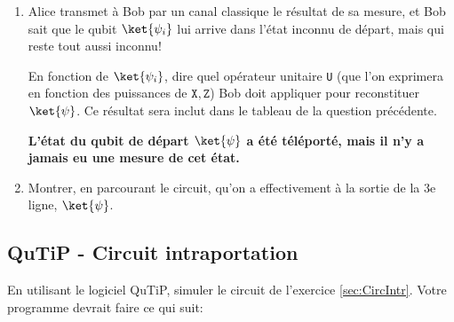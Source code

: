 \begin{enumerate}
\item Alice transmet à Bob par un canal classique le résultat de sa mesure, et
Bob sait que le qubit $\ket{\psi_{i}}$ lui arrive dans l'état inconnu de départ,
mais qui reste tout aussi inconnu!

En fonction de $\ket{\psi_{i}}$, dire quel opérateur unitaire \texttt{U} (que
l'on exprimera en fonction des puissances de $\mathtt{X},\mathtt{Z}$) Bob doit
appliquer pour reconstituer $\ket{\psi}$. Ce résultat sera inclut dans le
tableau de la question précédente.

\textbf{ L'état du qubit de départ $\ket{\psi}$ a été téléporté, mais il n'y a
jamais eu une mesure de cet état.}

\item Montrer, en parcourant le circuit, qu'on a effectivement à la sortie de
la 3e ligne, $\ket{\psi}$.

\end{enumerate}

\subsection{QuTiP - Circuit intraportation}

En utilisant le logiciel QuTiP, simuler le circuit de l'exercice 
\ref{sec:CircIntr}. Votre programme devrait faire ce qui suit:

